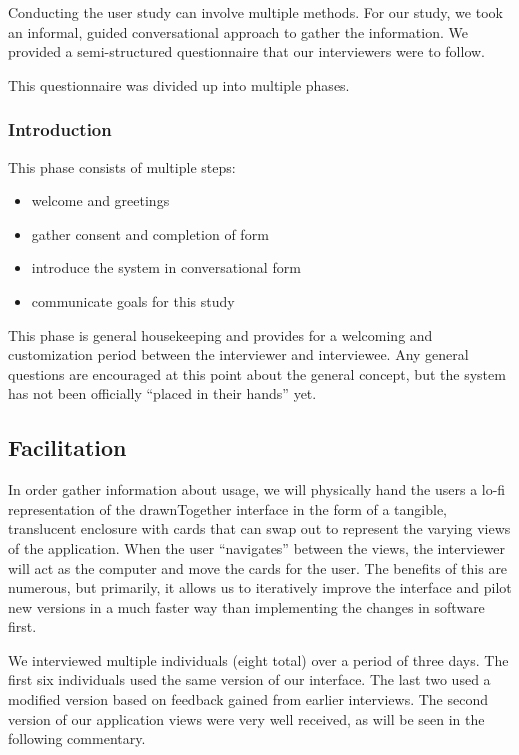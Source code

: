 \documentclass{chi2009}
\begin{document}
Conducting the user study can involve multiple methods.  For our study, we took
an informal, guided conversational approach to gather the information.  We
provided a semi-structured questionnaire that our interviewers were to follow.

This questionnaire was divided up into multiple phases.

\subsubsection{ Introduction }

This phase consists of multiple steps:
\begin{itemize}
\item welcome and greetings
\item gather consent and completion of form
\item introduce the system in conversational form
\item communicate goals for this study
\end{itemize}

This phase is general housekeeping and provides for a welcoming and
customization period between the interviewer and interviewee.  Any general
questions are encouraged at this point about the general concept, but the
system has not been officially ``placed in their hands'' yet.

\subsection{Facilitation}

In order gather information about usage, we will physically hand the users a
lo-fi representation of the drawnTogether interface in the form of a tangible,
translucent enclosure with cards that can swap out to represent the varying
views of the application.  When the user ``navigates'' between the views, the
interviewer will act as the computer and move the cards for the user.  The
benefits of this are numerous, but primarily, it allows us to iteratively
improve the interface and pilot new versions in a much faster way than
implementing the changes in software first.

We interviewed multiple individuals (eight total) over a period of three days.
The first six individuals used the same version of our interface.  The last two
used a modified version based on feedback gained from earlier interviews.  The
second version of our application views were very well received, as will be
seen in the following commentary.
\end{document}
